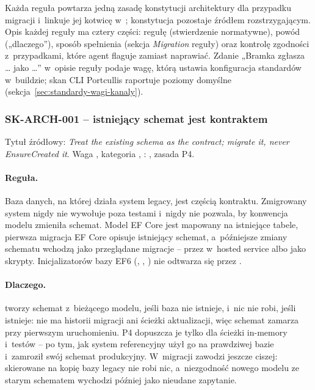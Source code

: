 Każda reguła  powtarza jedną zasadę konstytucji architektury dla przypadku
migracji i~linkuje jej kotwicę w~; konstytucja pozostaje
źródłem rozstrzygającym. Opis każdej reguły ma cztery części: regułę (stwierdzenie
normatywne), powód („dlaczego”), sposób spełnienia (sekcja \emph{Migration} reguły) oraz
kontrolę zgodności z~przypadkami, które agent flaguje zamiast naprawiać. Zdanie „Bramka
zgłasza … jako …” w~opisie reguły podaje wagę, którą ustawia konfiguracja standardów
w~buildzie; skan CLI Portcullis raportuje poziomy domyślne
(sekcja~\ref{sec:standardy-wagi-kanaly}).

\subsubsection{SK-ARCH-001 -- istniejący schemat jest kontraktem}\label{sec:standardy-sk-arch-001}

Tytuł źródłowy: \emph{Treat the existing schema as the contract; migrate it, never
EnsureCreated it}. Waga , kategoria ,
: , zasada P4.

\paragraph{Reguła.} Baza danych, na której działa system legacy, jest częścią kontraktu.
Zmigrowany system nigdy nie wywołuje  poza testami
i~nigdy nie pozwala, by konwencja modelu zmieniła schemat. Model EF Core jest mapowany na
istniejące tabele, pierwsza migracja EF Core opisuje istniejący schemat, a~późniejsze zmiany
schematu wchodzą jako przeglądane migracje -- przez  w~hosted service
albo jako skrypty. Inicjalizatorów bazy EF6 (,
, ) nie
odtwarza się przez .

\paragraph{Dlaczego.}  tworzy schemat z~bieżącego modelu, jeśli baza
nie istnieje, i~nic nie robi, jeśli istnieje: nie ma historii migracji ani ścieżki
aktualizacji, więc schemat zamarza przy pierwszym uruchomieniu. P4 dopuszcza je tylko dla
ścieżki in-memory i~testów -- po tym, jak system referencyjny użył go na prawdziwej bazie
i~zamroził swój schemat produkcyjny. W~migracji zawodzi jeszcze ciszej: skierowane na kopię
bazy legacy nie robi nic, a~niezgodność nowego modelu ze starym schematem wychodzi później
jako nieudane zapytanie.

